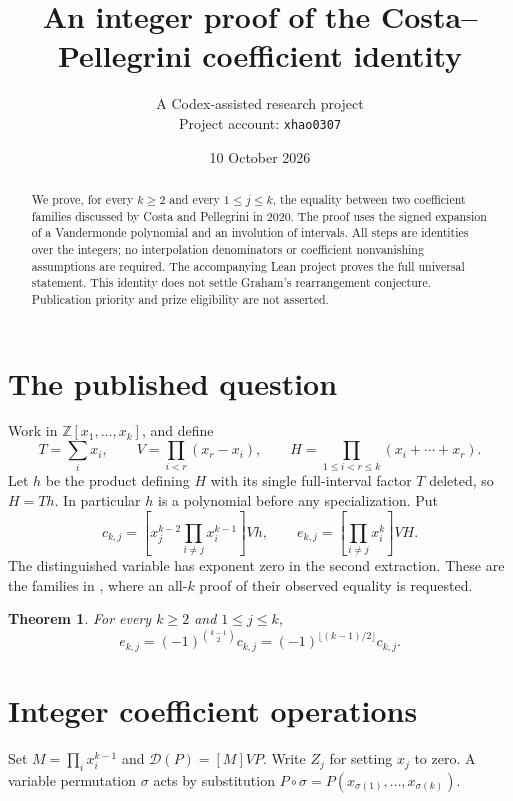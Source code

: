 \documentclass[11pt]{article}
\title{An integer proof of the Costa--Pellegrini coefficient identity}
\author{A Codex-assisted research project\\
  \small Project account: \texttt{xhao0307}}
\date{10 October 2026}
\newtheorem{theorem}{Theorem}
\newcommand{\coeff}[2]{\left[#1\right]#2}
\newcommand{\D}{\mathcal D}
\begin{document}
\maketitle
\begin{abstract}
We prove, for every $k\ge2$ and every $1\le j\le k$, the equality between
two coefficient families discussed by Costa and Pellegrini in 2020.
The proof uses the signed expansion of a Vandermonde polynomial and an
involution of intervals. All steps are identities over the integers;
no interpolation denominators or coefficient nonvanishing assumptions
are required. The accompanying Lean project proves the full universal
statement. This identity does not settle Graham's rearrangement conjecture.
Publication priority and prize eligibility are not asserted.
\end{abstract}

\section{The published question}
Work in $\mathbb Z[x_1,\ldots,x_k]$, and define
\[
 T=\sum_i x_i,\qquad V=\prod_{i<r}(x_r-x_i),\qquad
 H=\prod_{1\le i<r\le k}(x_i+\cdots+x_r).
\]
Let $h$ be the product defining $H$ with its single full-interval factor
$T$ deleted, so $H=Th$. In particular $h$ is a polynomial before any
specialization. Put
\[
 c_{k,j}=\coeff{x_j^{k-2}\prod_{i\ne j}x_i^{k-1}}{Vh},\qquad
 e_{k,j}=\coeff{\prod_{i\ne j}x_i^k}{VH}.
\]
The distinguished variable has exponent zero in the second extraction.
These are the families in \cite[Section 4.1, p.~485]{CP}, where an
all-$k$ proof of their observed equality is requested.

\begin{theorem}\label{thm:main}
For every $k\ge2$ and $1\le j\le k$,
\[
 e_{k,j}=(-1)^{\binom{k-1}{2}}c_{k,j}
        =(-1)^{\lfloor(k-1)/2\rfloor}c_{k,j}.
\]
\end{theorem}

\section{Integer coefficient operations}
Set $M=\prod_i x_i^{k-1}$ and $\D(P)=\coeff{M}{VP}$.
Write $Z_j$ for setting $x_j$ to zero. A variable permutation $\sigma$
acts by substitution $P\circ\sigma=P(x_{\sigma(1)},\ldots,x_{\sigma(k)})$.
\end{document}
